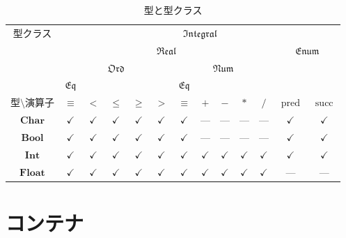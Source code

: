 \documentclass[twocolumn]{jsbook}
\newcommand{\typeclassname}[1]{\mathfrak{#1}}
\newcommand{\typeclassenum}{\typeclassname{Enum}}
\newcommand{\typeclasseq}{\typeclassname{Eq}}
\newcommand{\typeclassintegral}{\typeclassname{Integral}}
\newcommand{\typeclassnum}{\typeclassname{Num}}
\newcommand{\typeclassord}{\typeclassname{Ord}}
\newcommand{\typeclassreal}{\typeclassname{Real}}
\newcommand{\typename}[1]{\mathbf{#1}}
\newcommand{\typebool}{\typename{Bool}}
\newcommand{\typechar}{\typename{Char}}
\newcommand{\typeint}{\typename{Int}}
\newcommand{\typefloat}{\typename{Float}}
\newcommand{\binaryeq}{\equiv}
\newcommand{\binaryl}{<}
\newcommand{\binaryle}{\le}
\newcommand{\binaryge}{\ge}
\newcommand{\binaryg}{>}
\newcommand{\binaryadd}{+}
\newcommand{\binarysub}{-}
\newcommand{\binarymultiply}{*}
\newcommand{\binarydivide}{/}
\newcommand{\functionpred}{\mathop{\text{pred}}}
\newcommand{\functionsucc}{\mathop{\text{succ}}}
\begin{document}
\begin{table*}[tbp]
\caption{型と型クラス}
\label{tab:type-and-typeclass}
\begin{center}
\begin{tabular}{||c||c|c|c|c|c|c|c|c|c|c|c|c||}
\hline
\multirow{4}{*}{型クラス}
    &\multicolumn{12}{|c||}{$\typeclassintegral$}\\
\cline{2-13}
\multirow{3}{*}{}
    &\multicolumn{10}{|c|}{$\typeclassreal$}
    &\multicolumn{2}{|c||}{$\typeclassenum$}\\
\cline{2-11}
\multirow{2}{*}{}
    &\multicolumn{5}{|c|}{$\typeclassord$}
    &\multicolumn{5}{|c|}{$\typeclassnum$}
    &\multicolumn{2}{|c||}{ }\\
\cline{2-2}\cline{7-7}
{ }
    &$\typeclasseq$
    &\multicolumn{4}{|c|}{ }
    &$\typeclasseq$
    &\multicolumn{4}{|c|}{ }
    &\multicolumn{2}{|c||}{ }\\
\hline\hline
型$\setminus$演算子
    &$\binaryeq$
    &$\binaryl$
    &$\binaryle$
    &$\binaryge$
    &$\binaryg$
    &$\binaryeq$
    &$\binaryadd$
    &$\binarysub$
    &$\binarymultiply$
    &$\binarydivide$
    &$\functionpred$
    &$\functionsucc$\\
\hline
$\typechar$
    &$\checkmark$
    &$\checkmark$
    &$\checkmark$
    &$\checkmark$
    &$\checkmark$
    &$\checkmark$
    &---
    &---
    &---
    &---
    &$\checkmark$
    &$\checkmark$\\
\hline
$\typebool$
    &$\checkmark$
    &$\checkmark$
    &$\checkmark$
    &$\checkmark$
    &$\checkmark$
    &$\checkmark$
    &---
    &---
    &---
    &---
    &$\checkmark$
    &$\checkmark$\\
\hline
$\typeint$
    &$\checkmark$
    &$\checkmark$
    &$\checkmark$
    &$\checkmark$
    &$\checkmark$
    &$\checkmark$
    &$\checkmark$
    &$\checkmark$
    &$\checkmark$
    &$\checkmark$
    &$\checkmark$
    &$\checkmark$\\
\hline
$\typefloat$
    &$\checkmark$
    &$\checkmark$
    &$\checkmark$
    &$\checkmark$
    &$\checkmark$
    &$\checkmark$
    &$\checkmark$
    &$\checkmark$
    &$\checkmark$
    &$\checkmark$
    &---
    &---\\
\hline
\end{tabular}
\end{center}
\end{table*}

\chapter{コンテナ}
\end{document}
